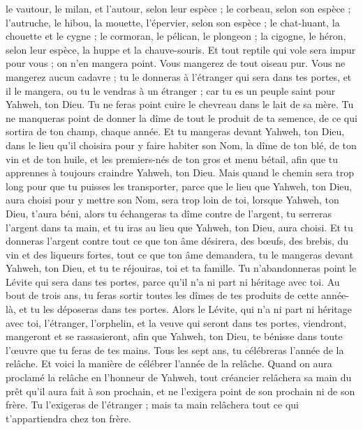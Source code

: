 \begin{multicols}{2}
le vautour, le milan, et l'autour, selon leur espèce ;
le corbeau, selon son espèce ;
l’autruche, le hibou, la mouette, l’épervier, selon son espèce ;
le chat-huant, la chouette et le cygne ;
le cormoran, le pélican, le plongeon ;
la cigogne, le héron, selon leur espèce, la huppe et la chauve-souris.
Et tout reptile qui vole sera impur pour vous ; on n'en mangera point.
Vous mangerez de tout oiseau pur.
Vous ne mangerez aucun cadavre ; tu le donneras à l'étranger qui sera dans tes portes, et il le mangera, ou tu le vendras à un étranger ; car tu es un peuple saint pour Yahweh, ton Dieu. Tu ne feras point cuire le chevreau dans le lait de sa mère.
Tu ne manqueras point de donner la dîme\FTNT{} de tout le produit de ta semence, de ce qui sortira de ton champ, chaque année.
Et tu mangeras devant Yahweh, ton Dieu, dans le lieu qu'il choisira pour y faire habiter son Nom, la dîme de ton blé, de ton vin et de ton huile, et les premiers-nés de ton gros et menu bétail, afin que tu apprennes à toujours craindre Yahweh, ton Dieu.
Mais quand le chemin sera trop long pour que tu puisses les transporter, parce que le lieu que Yahweh, ton Dieu, aura choisi pour y mettre son Nom, sera trop loin de toi, lorsque Yahweh, ton Dieu, t'aura béni,
alors tu échangeras ta dîme contre de l’argent, tu serreras l'argent dans ta main, et tu iras au lieu que Yahweh, ton Dieu, aura choisi.
Et tu donneras l’argent contre tout ce que ton âme désirera, des bœufs, des brebis, du vin et des liqueurs fortes, tout ce que ton âme demandera, tu le mangeras devant Yahweh, ton Dieu, et tu te réjouiras, toi et ta famille.
Tu n'abandonneras point le Lévite qui sera dans tes portes, parce qu'il n'a ni part ni héritage avec toi\FTNT{}.
Au bout de trois ans, tu feras sortir toutes les dîmes de tes produits de cette année-là, et tu les déposeras dans tes portes.
Alors le Lévite, qui n'a ni part ni héritage avec toi, l'étranger, l'orphelin, et la veuve qui seront dans tes portes, viendront, mangeront et se rassasieront, afin que Yahweh, ton Dieu, te bénisse dans toute l’œuvre que tu feras de tes mains.
\VerseOne{}Tous les sept ans, tu célébreras l’année de la relâche.
Et voici la manière de célébrer l’année de la relâche. Quand on aura proclamé la relâche en l'honneur de Yahweh, tout créancier relâchera sa main du prêt qu’il aura fait à son prochain, et ne l'exigera point de son prochain ni de son frère.
Tu l’exigeras de l'étranger ; mais ta main relâchera tout ce qui t’appartiendra chez ton frère.

\end{multicols}
